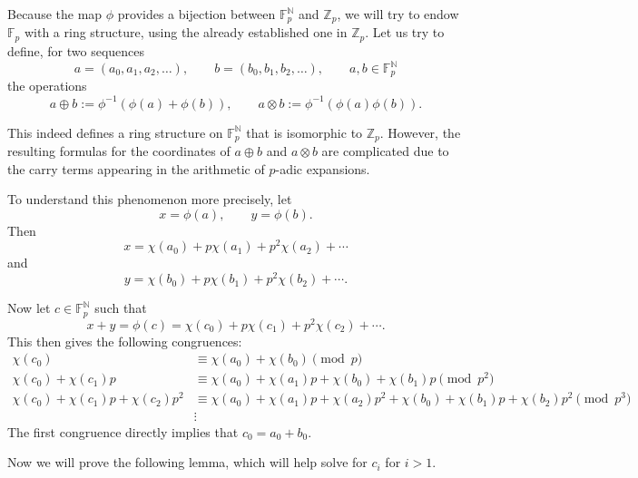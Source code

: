 \documentclass[oneside, a4paper, onecolumn, 11pt]{article}
\theoremstyle{definition}
\begin{document}
Because the map $\phi$ provides a bijection between $\mathbb{F}_p^{\mathbb{N}}$ and $\mathbb{Z}_p$, we will try to endow $\mathbb{F}_p$ with a ring structure, using the already established one in $\mathbb{Z}_p$.
Let us try to define, for two sequences \[a=(a_0,a_1,a_2,\ldots), \qquad b=(b_0,b_1,b_2,\ldots), \qquad a,b\in\mathbb{F}_p^{\mathbb{N}}\]
the operations \[a \oplus b := \phi^{-1}(\phi(a)+\phi(b)), \qquad a \otimes b := \phi^{-1}(\phi(a)\phi(b)).\]

This indeed defines a ring structure on $\mathbb{F}_p^{\mathbb{N}}$ that is isomorphic to $\mathbb{Z}_p$. However, the resulting formulas for the coordinates of $a\oplus b$ and $a\otimes b$ are complicated due to the carry terms appearing in the arithmetic of $p$-adic expansions.

To understand this phenomenon more precisely, let \[x=\phi(a), \qquad y=\phi(b).\]
Then \[x=\chi(a_0)+p\chi(a_1)+p^2\chi(a_2)+\cdots\]
and \[y=\chi(b_0)+p\chi(b_1)+p^2\chi(b_2)+\cdots.\]

Now let $c\in\mathbb{F}_p^{\mathbb{N}}$ such that \[ x+y=\phi(c)=\chi(c_0)+p\chi(c_1)+p^2\chi(c_2)+\cdots.\]
This then gives the following congruences:
\begin{equation}\label{original_congruence}
\begin{aligned}
\chi(c_0) &\equiv \chi(a_0) + \chi(b_0) \pmod{p} \\
\chi(c_0) + \chi(c_1)p &\equiv \chi(a_0) + \chi(a_1)p + \chi(b_0) + \chi(b_1)p \pmod{p^2} \\
\chi(c_0) + \chi(c_1)p + \chi(c_2)p^2 &\equiv \chi(a_0) + \chi(a_1)p + \chi(a_2)p^2  + \chi(b_0) + \chi(b_1)p + \chi(b_2)p^2 \pmod{p^3} \\
&\vdots
\end{aligned}
\end{equation}
The first congruence directly implies that $c_0=a_0+b_0$.

Now we will prove the following lemma, which will help solve for $c_i$ for $i>1$.
\end{document}
